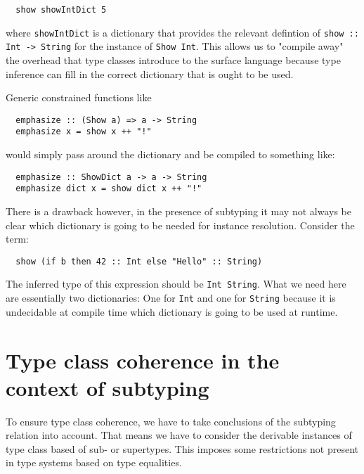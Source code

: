 \begin{verbatim}
  show showIntDict 5
\end{verbatim}

where \texttt{showIntDict} is a dictionary that provides the relevant defintion of \texttt{show :: Int -> String} for the instance of \texttt{Show Int}.
This allows us to "compile away" the overhead that type classes introduce to the surface language because type inference can fill in the correct dictionary that is ought to be used.

Generic constrained functions like

\begin{verbatim}
  emphasize :: (Show a) => a -> String
  emphasize x = show x ++ "!"
\end{verbatim}

would simply pass around the dictionary and be compiled to something like:

\begin{verbatim}
  emphasize :: ShowDict a -> a -> String
  emphasize dict x = show dict x ++ "!"
\end{verbatim}

\cite{kiselyov}

There is a drawback however, in the presence of subtyping it may not always be clear which dictionary is going to be needed for instance resolution.
Consider the term:

\begin{verbatim}
  show (if b then 42 :: Int else "Hello" :: String)
\end{verbatim}

The inferred type of this expression should be \texttt{Int \/ String}.
What we need here are essentially two dictionaries: One for \texttt{Int} and one for \texttt{String} because it is undecidable at compile time which dictionary is going to be used at runtime.


\section{Type class coherence in the context of subtyping}
  To ensure type class coherence, we have to take conclusions of the subtyping relation into account.
  That means we have to consider the derivable instances of type class based of sub- or supertypes.
  This imposes some restrictions not present in type systems based on type equalities.

